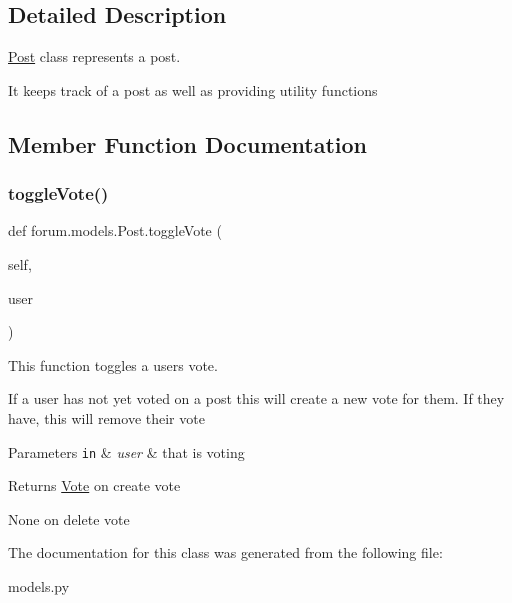 \subsection{Detailed Description}
\mbox{\hyperlink{classforum_1_1models_1_1_post}{Post}} class represents a post. 

It keeps track of a post as well as providing utility functions 

\subsection{Member Function Documentation}
\mbox{\label{classforum_1_1models_1_1_post_ad4ec8bc0d7695b437af426923c4d18fa}} 
\subsubsection{\texorpdfstring{toggle\+Vote()}{toggleVote()}}
{\footnotesize\ttfamily def forum.\+models.\+Post.\+toggle\+Vote (\begin{DoxyParamCaption}\item[{}]{self,  }\item[{}]{user }\end{DoxyParamCaption})}



This function toggles a user\textquotesingle{}s vote. 

If a user has not yet voted on a post this will create a new vote for them. If they have, this will remove their vote


\begin{DoxyParams}[1]{Parameters}
\mbox{\tt in}  & {\em user} & that is voting\\
\hline
\end{DoxyParams}
\begin{DoxyReturn}{Returns}
\mbox{\hyperlink{classforum_1_1models_1_1_vote}{Vote}} on create vote 

None on delete vote 
\end{DoxyReturn}


The documentation for this class was generated from the following file\+:\begin{DoxyCompactItemize}
\item 
models.\+py\end{DoxyCompactItemize}
